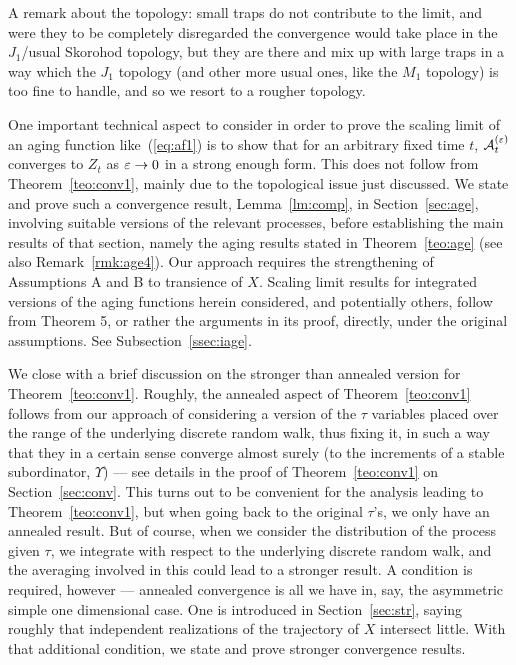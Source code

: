 A remark about the topology: small traps do not contribute to the limit, and were they to be completely disregarded 
the convergence would take place in the $J_1$/usual Skorohod topology, 
but they are there and mix up with large traps in a way which the $J_1$ topology 
(and other more usual ones, like the $M_1$ topology) is too fine to handle, and so we resort to a rougher topology.

One important technical aspect to consider in order to prove the scaling limit of an aging function like~(\ref{eq:af1}) 
is to show that for an arbitrary fixed time $t$, ${\cal A}^{(\varepsilon)}_t$ converges to $Z_t$ as $\varepsilon\to0$ in a strong enough form. 
This does not follow from Theorem~\ref{teo:conv1}, mainly due to the topological issue just discussed.
We state and prove such a convergence result, Lemma~\ref{lm:comp}, in Section~\ref{sec:age}, 
involving suitable versions of the relevant processes, 
before establishing the main results of that section, namely the aging results stated in 
Theorem~\ref{teo:age} (see also Remark~\ref{rmk:age4}). 
Our approach requires the strengthening of Assumptions A and B to transience of $X$. 
Scaling limit results for integrated versions of the aging functions herein considered, and potentially 
others, follow from Theorem 5, or rather the arguments in its proof, directly, under the original assumptions. 
See Subsection~\ref{ssec:iage}.

We close with a brief discussion on the stronger than annealed version for Theorem~\ref{teo:conv1}. Roughly, the annealed aspect of
Theorem~\ref{teo:conv1} follows from our approach of considering a version of the 
$\tau$ variables placed over the range of the underlying discrete random walk, thus fixing it, in such a way that they in a certain sense 
converge almost surely (to the increments of a stable subordinator, $\Upsilon$) --- see details in the proof of Theorem~\ref{teo:conv1} on
Section~\ref{sec:conv}. This turns out to be convenient for the analysis leading to Theorem~\ref{teo:conv1}, but when going back to the original
$\tau$'s, we only have an annealed result.
But of course, when we consider the distribution of the process given $\tau$, we integrate with respect to the underlying discrete random walk, 
and the averaging involved in this could lead to a stronger result. 
A condition is required, however --- annealed convergence is all we have in, say, the asymmetric simple one dimensional case. One is
introduced in Section~\ref{sec:str}, saying roughly that independent realizations of the trajectory of $X$ intersect little. With
that additional condition, we state
and prove stronger convergence results.
